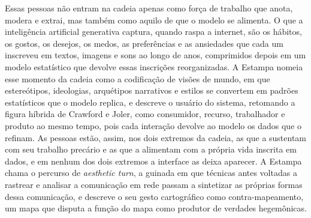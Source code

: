 Essas pessoas não entram na cadeia apenas como força de trabalho que anota, modera e extrai, mas também como aquilo de que o modelo se alimenta. O que a inteligência artificial generativa captura, quando raspa a internet, são os hábitos, os gostos, os desejos, os medos, as preferências e as ansiedades que cada um inscreveu em textos, imagens e sons ao longo de anos, comprimidos depois em um modelo estatístico que devolve essas inscrições reorganizadas. A Estampa nomeia esse momento da cadeia como a codificação de visões de mundo, em que estereótipos, ideologias, arquétipos narrativos e estilos se convertem em padrões estatísticos que o modelo replica, e descreve o usuário do sistema, retomando a figura híbrida de Crawford e Joler, como consumidor, recurso, trabalhador e produto ao mesmo tempo, pois cada interação devolve ao modelo os dados que o refinam. As pessoas estão, assim, nos dois extremos da cadeia, as que a sustentam com seu trabalho precário e as que a alimentam com a própria vida inscrita em dados, e em nenhum dos dois extremos a interface as deixa aparecer. A Estampa chama o percurso de \emph{aesthetic turn}, a guinada em que técnicas antes voltadas a rastrear e analisar a comunicação em rede passam a sintetizar as próprias formas dessa comunicação, e descreve o seu gesto cartográfico como contra-mapeamento, um mapa que disputa a função do mapa como produtor de verdades hegemônicas.

